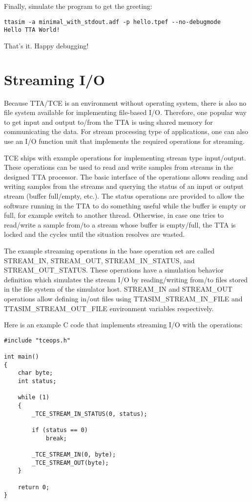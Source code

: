 \documentclass[twoside]{tceusermanual}
\begin{document}
Finally, simulate the program to get the greeting:

\begin{verbatim}
ttasim -a minimal_with_stdout.adf -p hello.tpef --no-debugmode
Hello TTA World!
\end{verbatim}

That's it. Happy debugging!

\section{Streaming I/O}
\label{section:streamIO}

Because TTA/TCE is an environment without operating system, there is also
no file system available for implementing file-based I/O. Therefore, one
popular way to get input and output to/from the TTA is using shared memory
for communicating the data. For stream processing type of applications,
one can also use an I/O function unit that implements the required 
operations for streaming.

TCE ships with example operations for implementing stream type input/output. 
These operations can be used to read and write samples from streams in the
designed TTA processor. The basic interface of the operations allows reading and 
writing samples from the streams and querying the status of an input or output stream 
(buffer full/empty, etc.). The status operations are provided to
allow the software running in the TTA to do something useful while the
buffer is empty or full, for example switch to another thread. Otherwise,
in case one tries to read/write a sample from/to a stream whose buffer is 
empty/full, the TTA is locked and the cycles until the situation resolves
are wasted.

The example streaming operations in the base operation set are 
called STREAM\_IN, STREAM\_OUT, STREAM\_IN\_STATUS, and STREAM\_OUT\_STATUS.
These operations have a simulation behavior definition which simulates the
stream I/O by reading/writing from/to files stored in the file system of 
the simulator host. STREAM\_IN and STREAM\_OUT operations allow defining
in/out files using TTASIM\_STREAM\_IN\_FILE and TTASIM\_STREAM\_OUT\_FILE
environment variables respectively.

Here is an example C code that implements streaming I/O with the operations:

\begin{verbatim}
#include "tceops.h"

int main()
{
    char byte;
    int status;

    while (1)
    {
        _TCE_STREAM_IN_STATUS(0, status);

        if (status == 0)
            break;

        _TCE_STREAM_IN(0, byte);
        _TCE_STREAM_OUT(byte);
    }

    return 0;
}
\end{verbatim}
\end{document}
